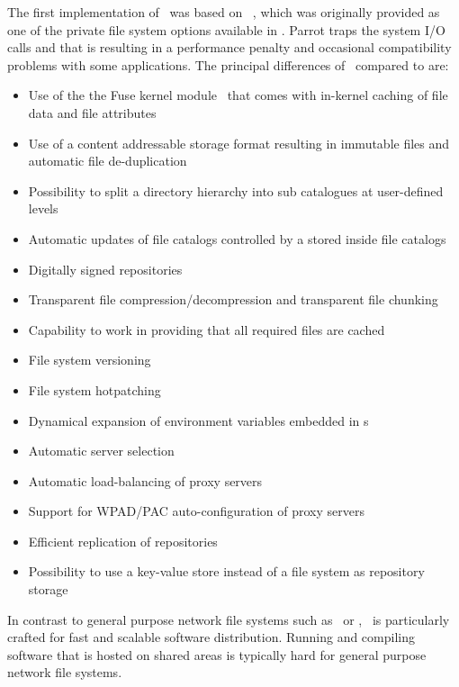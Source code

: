 The first implementation of \cvmfs\ was based on ~\cite{parrot05, growfs09}, which was originally provided as one of the private file system options available in . 
Parrot traps the system I/O calls and that is resulting in a performance penalty and occasional compatibility problems with some applications. 
The principal differences of \cvmfs\ compared to  are:
\begin{itemize}
	\item Use of the the Fuse kernel module~\cite{fuse} that comes with in-kernel caching of file data and file attributes
	\item Use of a content addressable storage format resulting in immutable files and automatic file de-duplication
	\item Possibility to split a directory hierarchy into sub catalogues at user-defined levels
	\item Automatic updates of file catalogs controlled by a  stored inside file catalogs
	\item Digitally signed repositories
	\item Transparent file compression/decompression and transparent file chunking
	\item Capability to work in  providing that all required files are cached
	\item File system versioning
	\item File system hotpatching
	\item Dynamical expansion of environment variables embedded in s
	\item Automatic server selection
	\item Automatic load-balancing of proxy servers
	\item Support for WPAD/PAC auto-configuration of proxy servers
	\item Efficient replication of repositories
	\item Possibility to use a key-value store instead of a file system as repository storage
\end{itemize}

In contrast to general purpose network file systems such as \nfs\ or \afs, \cvmfs\ is particularly crafted for fast and scalable software distribution.
Running and compiling software that is hosted on shared areas is typically hard for general purpose network file systems.


